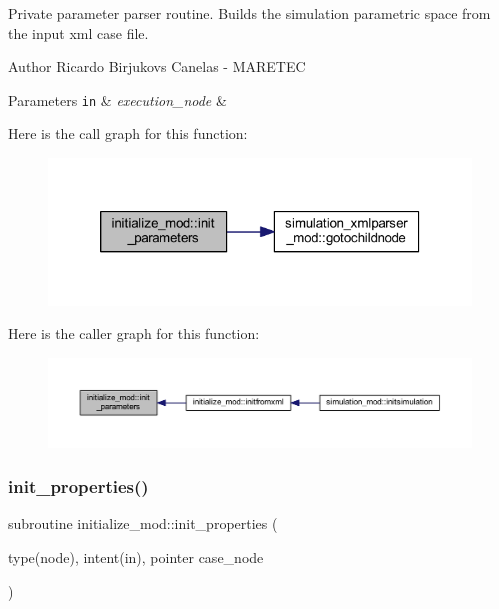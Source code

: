 Private parameter parser routine. Builds the simulation parametric space from the input xml case file. 

\begin{DoxyAuthor}{Author}
Ricardo Birjukovs Canelas -\/ M\+A\+R\+E\+T\+EC 
\end{DoxyAuthor}

\begin{DoxyParams}[1]{Parameters}
\mbox{\tt in}  & {\em execution\+\_\+node} & \\
\hline
\end{DoxyParams}
Here is the call graph for this function\+:\nopagebreak
\begin{figure}[H]
\begin{center}
\leavevmode
\includegraphics[width=320pt]{namespaceinitialize__mod_aac9d9dabb797c83e360f9ae60a7e65e3_cgraph}
\end{center}
\end{figure}
Here is the caller graph for this function\+:\nopagebreak
\begin{figure}[H]
\begin{center}
\leavevmode
\includegraphics[width=350pt]{namespaceinitialize__mod_aac9d9dabb797c83e360f9ae60a7e65e3_icgraph}
\end{center}
\end{figure}
\mbox{\label{namespaceinitialize__mod_a4c7a93dca8bb7b573e91f877033ab22a}} 
\subsubsection{\texorpdfstring{init\+\_\+properties()}{init\_properties()}}
{\footnotesize\ttfamily subroutine initialize\+\_\+mod\+::init\+\_\+properties (\begin{DoxyParamCaption}\item[{type(node), intent(in), pointer}]{case\+\_\+node }\end{DoxyParamCaption})\hspace{0.3cm}{\ttfamily [private]}}



